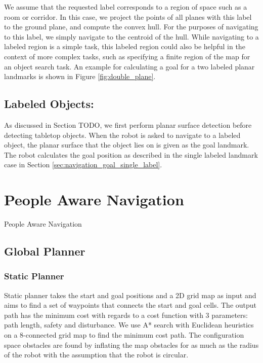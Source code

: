 \documentclass[12pt]{gatech-thesis}
\begin{document}
We assume that the requested label corresponds to a region of space such as a room or corridor. In this case, we project the points of all planes with this label to the ground plane, and compute the convex hull. For the purposes of navigating to this label, we simply navigate to the centroid of the hull. While navigating to a labeled region is a simple task, this labeled region could also be helpful in the context of more complex tasks, such as specifying a finite region of the map for an object search task. An example for calculating a goal for a two labeled planar landmarks is shown in Figure \ref{fig:double_plane}. 


\subsection{Labeled Objects:} As discussed in Section TODO, we first perform planar surface detection before detecting tabletop objects. When the robot is asked to navigate to a labeled object, the planar surface that the object lies on is given as the goal landmark. The robot calculates the goal position as described in the single labeled landmark case in Section \ref{sec:navigation_goal_single_label}.

\section{People Aware Navigation}
\label{sec:navigation_people_aware_navigation}

People Aware Navigation

\subsection{Global Planner}

\subsubsection{Static Planner}
Static planner takes the start and goal positions and a 2D grid map as input and aims to find a set of waypoints that connects the start and goal cells. The output path has the minimum cost with regards to a cost function with 3 parameters: path length, safety and disturbance. We use A* search with Euclidean heuristics on a 8-connected grid map to find the minimum cost path. The configuration space obstacles are found by inflating the map obstacles for as much as the radius of the robot with the assumption that the robot is circular.
\end{document}
